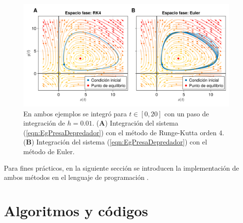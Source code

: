 \begin{figure}[h!]
	\centering
	\includegraphics[scale=0.23]{../Imagenes/RK4vsEuler}
	\caption{En ambos ejemplos se integró para $t\in[0,20]$ con un paso de integración de $h=0.01$. (\textbf{A}) Integración del sistema (\ref{eqn:EgPresaDepredador}) con el método de Runge-Kutta orden 4. (\textbf{B}) Integración del sistema (\ref{eqn:EgPresaDepredador}) con el método de Euler.}
	\label{fig:Rk4vsEuler}
\end{figure}

Para fines prácticos, en la siguiente sección se introducen la implementación de ambos métodos en el lenguaje de programación \julia.

\section{Algoritmos y códigos}

